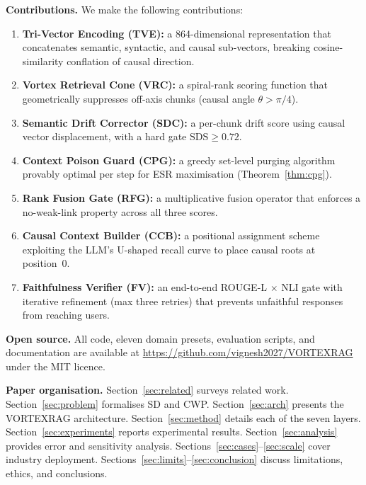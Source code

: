\documentclass[10pt,twocolumn]{article}
\newcommand{\parasep}{\vspace{2pt}}
\begin{document}
\parasep
\noindent\textbf{Contributions.} We make the following contributions:
\begin{enumerate}
  \item \textbf{Tri-Vector Encoding (TVE):} a 864-dimensional representation
    that concatenates semantic, syntactic, and causal sub-vectors, breaking
    cosine-similarity conflation of causal direction.
  \item \textbf{Vortex Retrieval Cone (VRC):} a spiral-rank scoring function
    that geometrically suppresses off-axis chunks (causal angle $\theta > \pi/4$).
  \item \textbf{Semantic Drift Corrector (SDC):} a per-chunk drift score using
    causal vector displacement, with a hard gate $\text{SDS} \geq 0.72$.
  \item \textbf{Context Poison Guard (CPG):} a greedy set-level purging algorithm
    provably optimal per step for ESR maximisation (Theorem~\ref{thm:cpg}).
  \item \textbf{Rank Fusion Gate (RFG):} a multiplicative fusion operator that
    enforces a no-weak-link property across all three scores.
  \item \textbf{Causal Context Builder (CCB):} a positional assignment scheme
    exploiting the LLM's U-shaped recall curve to place causal roots at position~0.
  \item \textbf{Faithfulness Verifier (FV):} an end-to-end ROUGE-L $\times$ NLI
    gate with iterative refinement (max three retries) that prevents unfaithful
    responses from reaching users.
\end{enumerate}

\parasep
\noindent\textbf{Open source.} All code, eleven domain presets,
evaluation scripts, and documentation are available at
\url{https://github.com/vignesh2027/VORTEXRAG} under the MIT licence.

\parasep
\noindent\textbf{Paper organisation.}
Section~\ref{sec:related} surveys related work.
Section~\ref{sec:problem} formalises SD and CWP.
Section~\ref{sec:arch} presents the VORTEXRAG architecture.
Section~\ref{sec:method} details each of the seven layers.
Section~\ref{sec:experiments} reports experimental results.
Section~\ref{sec:analysis} provides error and sensitivity analysis.
Sections~\ref{sec:cases}--\ref{sec:scale} cover industry deployment.
Sections~\ref{sec:limits}--\ref{sec:conclusion} discuss limitations, ethics,
and conclusions.

\end{document}
